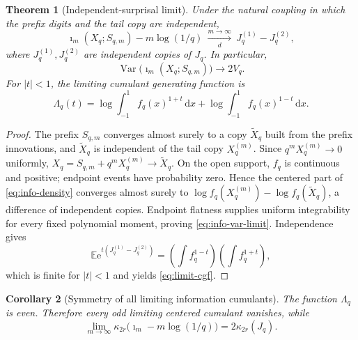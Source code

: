 \documentclass[11pt,oneside]{article}
\newtheorem{theorem}{Theorem}[section]
\newtheorem{corollary}[theorem]{Corollary}
\theoremstyle{definition}
\theoremstyle{remark}
\newcommand{\E}{\mathbb E}
\newcommand{\Var}{\operatorname{Var}}
\newcommand{\dd}{\,\mathrm d}
\newcommand{\e}{\mathrm e}
\begin{document}
\begin{theorem}[Independent-surprisal limit]
\label{thm:surprisal-limit}
Under the natural coupling in which the prefix digits and the tail copy are
independent,
\begin{equation}
 \imath_m(X_q;S_{q,m})-m\log(1/q)
 \ \xrightarrow[d]{m\to\infty}\ J_q^{(1)}-J_q^{(2)},
 \label{eq:surprisal-limit}
\end{equation}
where $J_q^{(1)},J_q^{(2)}$ are independent copies of $J_q$.  In particular,
\begin{equation}
 \Var\bigl(\imath_m(X_q;S_{q,m})\bigr)\longrightarrow2V_q.
 \label{eq:info-var-limit}
\end{equation}
For $|t|<1$, the limiting cumulant generating function is
\begin{equation}
 \boxed{
 \Lambda_q(t)
 =\log\int_{-1}^{1}f_q(x)^{1+t}\dd x
 +\log\int_{-1}^{1}f_q(x)^{1-t}\dd x.}
 \label{eq:limit-cgf}
\end{equation}
\end{theorem}

\begin{proof}
The prefix $S_{q,m}$ converges almost surely to a copy $\widetilde X_q$ built from
the prefix innovations, and $\widetilde X_q$ is independent of the tail copy
$X_q^{(m)}$.  Since $q^mX_q^{(m)}\to0$ uniformly,
$X_q=S_{q,m}+q^mX_q^{(m)}\to\widetilde X_q$.  On the open support, $f_q$ is
continuous and positive; endpoint events have probability zero.  Hence the
centered part of \eqref{eq:info-density} converges almost surely to
$\log f_q(X_q^{(m)})-\log f_q(\widetilde X_q)$, a difference of independent
copies.  Endpoint flatness supplies uniform integrability for every fixed
polynomial moment, proving \eqref{eq:info-var-limit}.  Independence gives
\[
 \E\e^{t(J_q^{(1)}-J_q^{(2)})}
 =\left(\int f_q^{1-t}\right)\left(\int f_q^{1+t}\right),
\]
which is finite for $|t|<1$ and yields \eqref{eq:limit-cgf}.
\end{proof}

\begin{corollary}[Symmetry of all limiting information cumulants]
\label{cor:info-cumulants}
The function $\Lambda_q$ is even.  Therefore every odd limiting centered cumulant
vanishes, while
\begin{equation}
 \lim_{m\to\infty}\kappa_{2r}
 \bigl(\imath_m-m\log(1/q)\bigr)
 =2\kappa_{2r}(J_q).
 \label{eq:info-even-cumulants}
\end{equation}
\end{corollary}
\end{document}
